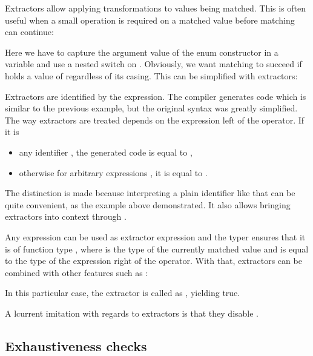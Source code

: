 \documentclass{haxe}
\begin{document}
Extractors allow applying transformations to values being matched. This is often useful when a small operation is required on a matched value before matching can continue:


Here we have to capture the argument value of the  enum constructor in a variable  and use a nested switch on . Obviously, we want matching to succeed if  holds a value of  regardless of its casing. This can be simplified with extractors:


Extractors are identified by the  expression. The compiler generates code which is similar to the previous example, but the original syntax was greatly simplified. The way extractors are treated depends on the expression left of the \expr{=>} operator. If it is

\begin{itemize}
	\item any identifier , the generated code is equal to ,
	\item otherwise for arbitrary expressions , it is equal to .
\end{itemize}

The distinction is made because interpreting a plain identifier like that can be quite convenient, as the  example above demonstrated. It also allows bringing extractors into context through .

Any expression can be used as extractor expression and the typer ensures that it is of function type , where  is the type of the currently matched value and  is equal to the type of the expression right of the \expr{=>} operator. With that, extractors can be combined with other features such as :


In this particular case, the extractor is called as , yielding true.

A lcurrent imitation with regards to extractors is that they disable .


\subsection{Exhaustiveness checks}
\label{lf-pattern-matching-exhaustiveness}
\end{document}
